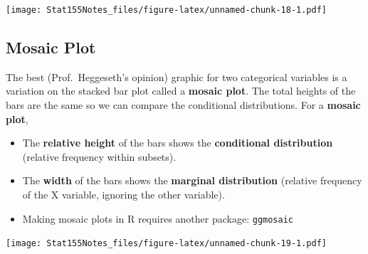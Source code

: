 \documentclass[]{book}
\newenvironment{Shaded}{\begin{snugshade}}{\end{snugshade}}
\newcommand{\DataTypeTok}[1]{\textcolor[rgb]{0.13,0.29,0.53}{#1}}
\newcommand{\KeywordTok}[1]{\textcolor[rgb]{0.13,0.29,0.53}{\textbf{#1}}}
\newcommand{\NormalTok}[1]{#1}
\newcommand{\OperatorTok}[1]{\textcolor[rgb]{0.81,0.36,0.00}{\textbf{#1}}}
\newcommand{\StringTok}[1]{\textcolor[rgb]{0.31,0.60,0.02}{#1}}
\providecommand{\tightlist}{%
  \setlength{\itemsep}{0pt}\setlength{\parskip}{0pt}}
\begin{document}
\texttt{[image: Stat155Notes\_files/figure-latex/unnamed-chunk-18-1.pdf]}

\hypertarget{mosaic-plot}{%
\subsection{Mosaic Plot}\label{mosaic-plot}}

The best (Prof.~Heggeseth's opinion) graphic for two categorical variables is a variation on the stacked bar plot called a \textbf{mosaic plot}. The total heights of the bars are the same so we can compare the conditional distributions. For a \textbf{mosaic plot},

\begin{itemize}
\tightlist
\item
  The \textbf{relative height} of the bars shows the \textbf{conditional distribution} (relative frequency within subsets).
\item
  The \textbf{width} of the bars shows the \textbf{marginal distribution} (relative frequency of the X variable, ignoring the other variable).
\item
  Making mosaic plots in R requires another package: \texttt{ggmosaic}
\end{itemize}

\begin{Shaded}
\end{Shaded}

\texttt{[image: Stat155Notes\_files/figure-latex/unnamed-chunk-19-1.pdf]}
\end{document}
